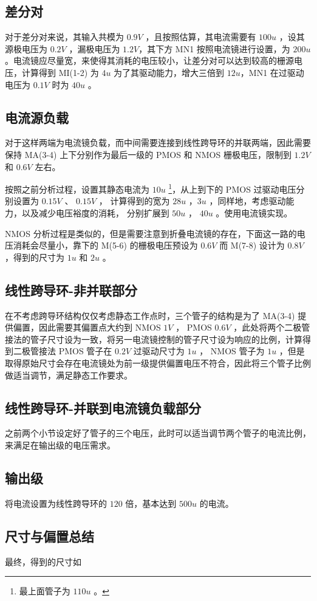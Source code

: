 \documentclass[lang=cn,11pt,a4paper,cite=authoryear]{elegantpaper}
\begin{document}
\subsection{差分对}

对于差分对来说，其输入共模为 \(0.9 V\) ，且按照估算，其电流需要有 \(100 u\) ，设其源极电压为 \(0.2 V\) ，漏极电压为 \(1.2V\)，其下方  MN1 按照电流镜进行设置，为 \(200 u\) 。电流镜应尽量宽，来使得其消耗的电压较小，让差分对可以达到较高的栅源电压，计算得到 MI(1-2) 为 \(4 u\) 为了其驱动能力，增大三倍到 \(12 u\)，MN1 在过驱动电压为 \(0.1 V\) 时为 \(40 u\) 。

\subsection{电流源负载} 

对于这样两端为电流镜负载，而中间需要连接到线性跨导环的并联两端，因此需要保持 MA(3-4) 上下分别作为最后一级的 PMOS 和 NMOS 栅极电压，限制到 \(1.2 V\) 和 \(0.6 V\) 左右。

按照之前分析过程，设置其静态电流为 \(10 u\) \footnote{最上面管子为 \(110 u\) 。}，从上到下的 PMOS 过驱动电压分别设置为 \(0.15 V\) 、 \(0.15 V\) ， 计算得到的宽为 \(28 u\) ，\(3 u\) ，同样地，考虑驱动能力，以及减少电压裕度的消耗， 分别扩展到 \(50 u\) ， \(40 u\) 。使用电流镜实现。

NMOS 分析过程是类似的，但是需要注意到折叠电流镜的存在，下面这一路的电压消耗会尽量小，靠下的 M(5-6) 的栅极电压预设为 \(0.6 V\) 而 M(7-8) 设计为 \(0.8 V\) ，得到的尺寸为 \(1 u\) 和 \(2 u\) 。

\subsection{线性跨导环-非并联部分} 

在不考虑跨导环结构仅仅考虑静态工作点时，三个管子的结构是为了 MA(3-4) 提供偏置，因此需要其偏置点大约到 NMOS \(1 V\) ， PMOS \(0.6 V\) ，此处将两个二极管接法的管子尺寸设为一致，将另一电流镜控制的管子尺寸设为响应的比例，计算得到二极管接法 PMOS 管子在 \(0.2 V\) 过驱动尺寸为 \(1 u\) ， NMOS 管子为 \(1 u\) ，但是取得原始尺寸会存在电流镜处为前一级提供偏置电压不符合，因此将三个管子比例做适当调节，满足静态工作要求。

\subsection{线性跨导环-并联到电流镜负载部分} 

之前两个小节设定好了管子的三个电压，此时可以适当调节两个管子的电流比例，来满足在输出级的电压需求。

\subsection{输出级} 

将电流设置为线性跨导环的 \(120\) 倍，基本达到 \(500 u\) 的电流。

\subsection*{尺寸与偏置总结}

最终，得到的尺寸如




\end{document}
